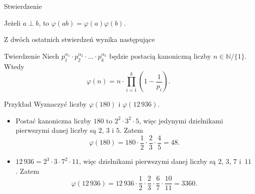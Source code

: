 \documentclass[a4paper,10pt]{beamer}
\begin{document}
\begin{frame}

	\begin{block}{Stwierdzenie}
	
	Jeżeli $a\perp b$, to $\varphi(ab)=\varphi(a)\varphi(b)$. %
	
	\end{block}
	
	Z dwóch ostatnich stwierdzeń wynika następujące

	\begin{block}{Twierdzenie}
		Niech $\displaystyle p_{1}^{\alpha_{1}}\cdot p_{2}^{\alpha_{2}}\cdot\ldots\cdot p_{k}^{\alpha_{k}}$ będzie postacią kanoniczną liczby $n\in\mathbb{N}/\{1\}$. Wtedy
		$$\varphi(n)=n\cdot\prod\limits_{i=1}^k\left(1-\frac1{p_i}\right).$$
	\end{block}
	
\end{frame}




\begin{frame}
	
	\begin{exampleblock}{Przykład}
		Wyznaczyć liczby $\varphi(180)$ i $\varphi(12\,936)$.
		\begin{itemize}
			\item Postać kanoniczna liczby $180$ to $2^2\cdot3^2\cdot5$, więc jedynymi dzielnikami pierwszymi danej liczby są $2,\,3$ i $5$. Zatem
			$$\varphi(180)=180\cdot\frac12\cdot\frac23\cdot\frac45=48.$$
			\item $12\,936=2^3\cdot3\cdot7^2\cdot11$, więc dzielnikami pierwszymi danej liczby są $2$, $3$, $7$ i~$11$. Zatem $$\varphi(12\,936)=12\,936\cdot\frac12\cdot\frac23\cdot\frac67\cdot\frac{10}{11}=3360.$$
		\end{itemize}		
	\end{exampleblock}
	
\end{frame}
\end{document}
